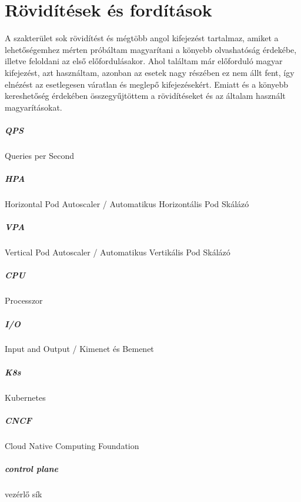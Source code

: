 \chapter{Rövidítések és fordítások}
\label{sec:abbreviations}

A szakterület sok rövidítést és mégtöbb angol kifejezést tartalmaz, amiket a lehetőségemhez mérten próbáltam magyarítani a könyebb olvashatóság érdekébe, illetve feloldani az első előfordulásakor.
Ahol találtam már előforduló magyar kifejezést, azt használtam, azonban az esetek nagy részében ez nem állt fent, így elnézést az esetlegesen váratlan és meglepő kifejezésekért.
Emiatt és a könyebb kereshetőség érdekében összegyűjtöttem a rövidítéseket és az általam használt magyarításokat.

\paragraph{QPS} Queries per Second
\paragraph{HPA} Horizontal Pod Autoscaler / Automatikus Horizontális Pod Skálázó
\paragraph{VPA} Vertical Pod Autoscaler / Automatikus Vertikális Pod Skálázó
\paragraph{CPU} Processzor
\paragraph{I/O} Input and Output / Kimenet és Bemenet
\paragraph{K8s} Kubernetes
\paragraph{CNCF} Cloud Native Computing Foundation
\paragraph{control plane} vezérlő sík
